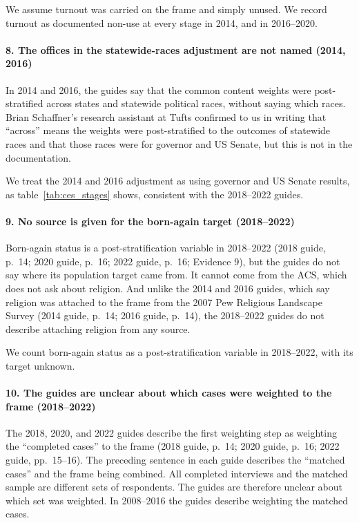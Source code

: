 \documentclass[12pt]{article}
\begin{document}
We assume turnout was carried on the frame and simply unused. We record turnout as documented non-use at every stage in 2014, and in 2016--2020.

\paragraph*{8. The offices in the statewide-races adjustment are not named (2014, 2016)}
In 2014 and 2016, the guides say that the common content weights were post-stratified across states and statewide political races, without saying which races. Brian Schaffner's research assistant at Tufts confirmed to us in writing that ``across'' means the weights were post-stratified to the outcomes of statewide races and that those races were for governor and US Senate, but this is not in the documentation.

We treat the 2014 and 2016 adjustment as using governor and US Senate results, as table~\ref{tab:ces_stages} shows, consistent with the 2018--2022 guides.

\paragraph*{9. No source is given for the born-again target (2018--2022)}
Born-again status is a post-stratification variable in 2018--2022 (2018 guide, p.~14; 2020 guide, p.~16; 2022 guide, p.~16; Evidence 9), but the guides do not say where its population target came from. It cannot come from the ACS, which does not ask about religion. And unlike the 2014 and 2016 guides, which say religion was attached to the frame from the 2007 Pew Religious Landscape Survey (2014 guide, p.~14; 2016 guide, p.~14), the 2018--2022 guides do not describe attaching religion from any source.

We count born-again status as a post-stratification variable in 2018--2022, with its target unknown.

\paragraph*{10. The guides are unclear about which cases were weighted to the frame (2018--2022)}
The 2018, 2020, and 2022 guides describe the first weighting step as weighting the ``completed cases'' to the frame (2018 guide, p.~14; 2020 guide, p.~16; 2022 guide, pp.~15--16). The preceding sentence in each guide describes the ``matched cases'' and the frame being combined. All completed interviews and the matched sample are different sets of respondents. The guides are therefore unclear about which set was weighted. In 2008--2016 the guides describe weighting the matched cases.
\end{document}
